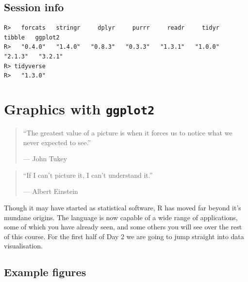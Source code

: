 \documentclass[
]{book}
\newenvironment{Shaded}{\begin{snugshade}}{\end{snugshade}}
\newcommand{\KeywordTok}[1]{\textcolor[rgb]{0.13,0.29,0.53}{\textbf{#1}}}
\newcommand{\NormalTok}[1]{#1}
\newcommand{\OperatorTok}[1]{\textcolor[rgb]{0.81,0.36,0.00}{\textbf{#1}}}
\newcommand{\StringTok}[1]{\textcolor[rgb]{0.31,0.60,0.02}{#1}}
\begin{document}
\hypertarget{session-info-2}{%
\section{Session info}\label{session-info-2}}

\begin{Shaded}
\end{Shaded}

\begin{verbatim}
R>   forcats   stringr     dplyr     purrr     readr     tidyr    tibble   ggplot2 
R>   "0.4.0"   "1.4.0"   "0.8.3"   "0.3.3"   "1.3.1"   "1.0.0"   "2.1.3"   "3.2.1" 
R> tidyverse 
R>   "1.3.0"
\end{verbatim}

\hypertarget{graphics}{%
\chapter{\texorpdfstring{Graphics with \textbf{\texttt{ggplot2}}}{Graphics with ggplot2}}\label{graphics}}

\begin{quote}
``The greatest value of a picture is when it forces us to notice what we never expected to see.''

--- John Tukey
\end{quote}

\begin{quote}
``If I can't picture it, I can't understand it.''

--- Albert Einstein
\end{quote}

Though it may have started as statistical software, R has moved far beyond it's mundane origins. The language is now capable of a wide range of applications, some of which you have already seen, and some others you will see over the rest of this course. For the first half of Day 2 we are going to jump straight into data visualisation.

\hypertarget{example-figures}{%
\section{Example figures}\label{example-figures}}
\end{document}
